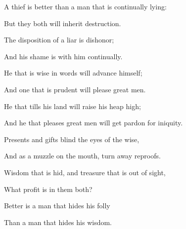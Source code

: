 {\par }{\Q {}A thief is better than a man that is continually lying:
\par }{\Q But they both will inherit destruction.
\par }{\Q {}The disposition of a liar is dishonor;
\par }{\Q And his shame is with him continually.
\par }{\BB \par }{\Q {}He that is wise in words will advance himself;
\par }{\Q And one that is prudent will please great men.
\par }{\Q {}He that tills his land will raise his heap high;
\par }{\Q And he that pleases great men will get pardon for iniquity.
\par }{\Q {}Presents and gifts blind the eyes of the wise,
\par }{\Q And as a muzzle on the mouth, turn away reproofs.
\par }{\Q {}Wisdom that is hid, and treasure that is out of sight,
\par }{\Q What profit is in them both?
\par }{\Q {}Better is a man that hides his folly
\par }{\Q Than a man that hides his wisdom.
\par }{\BB \par }
